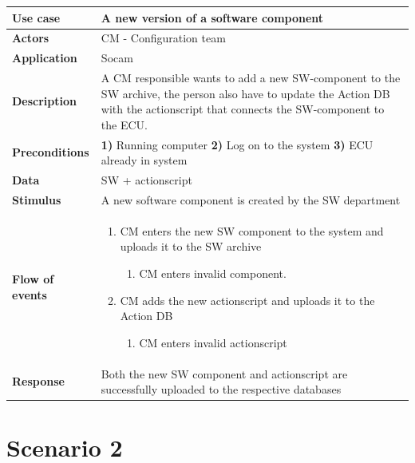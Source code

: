 	\begin{table}[H]
		\begin{tabular}{ p{4cm} | p{10cm} }
			\hline
			\rowcolor{gray}
			{\bf Use case} & {\bf A new version of a software component} \\ \hline
			{\bf Actors} & CM - Configuration team\\ \hline
			{\bf Application} & Socam \\ \hline
			{\bf Description} & A CM responsible wants to add a new SW-component to the 
			SW archive, the person also have to update the Action DB with the actionscript 
			that connects the SW-component to the ECU.\\ \hline
			{\bf Preconditions} & {\bf 1)} Running computer {\bf 2)} Log on to the system {\bf 3)} ECU already in system\\ \hline
			{\bf Data} & SW + actionscript \\ \hline
			{\bf Stimulus} & A new software component is created by the SW department \\ \hline
			{\bf Flow of events} & 

				\begin{enumerate}[font=\bfseries]
					\item CM enters the new SW component to the system and uploads it to the SW archive
					\begin{enumerate}[label*=\arabic*., font=\bfseries]
						\item CM enters invalid component. 
					\end{enumerate}
					
					\item CM adds the new actionscript and uploads it to the Action DB
					\begin{enumerate}[label*=\arabic*., font=\bfseries]
						\item CM enters invalid actionscript
					\end{enumerate}
				\end{enumerate}
			
			\\ \hline
			{\bf Response} & Both the new SW component and actionscript are 
			successfully uploaded to the respective databases \\ \hline

		\end{tabular}
	\end{table}

\section{Scenario 2}

